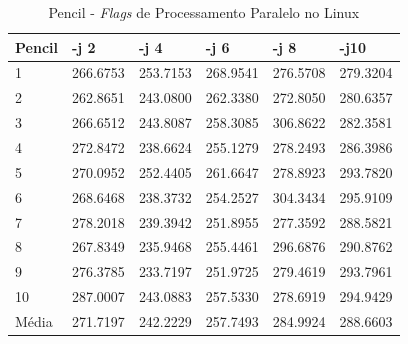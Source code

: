 \begin{apendicesenv}
\begin{table}[!ht]
\centering
\tiny
\caption{Pencil - \textit{Flags} de Processamento Paralelo no Linux}
\label{tab:flag_processamento_paralelo:linux:pencil}
\begin{tabular}{llllll}
\textbf{Pencil} & \textbf{-j 2} & \textbf{-j 4} & \textbf{-j 6} & \textbf{-j 8} & \textbf{-j10}  \\ \toprule
1                  & 266.6753  &   253.7153   &  268.9541 &    276.5708 &    279.3204       \\ 
2                  & 262.8651  &   243.0800   &  262.3380 &    272.8050 &    280.6357       \\ 
3                  & 266.6512  &   243.8087   &  258.3085 &    306.8622 &    282.3581       \\ 
4                  & 272.8472  &   238.6624   &  255.1279 &    278.2493 &    286.3986       \\ 
5                  & 270.0952  &   252.4405   &  261.6647 &    278.8923 &    293.7820       \\ 
6                  & 268.6468  &   238.3732   &  254.2527 &    304.3434 &    295.9109       \\ 
7                  & 278.2018  &   239.3942   &  251.8955 &    277.3592 &    288.5821       \\ 
8                  & 267.8349  &   235.9468   &  255.4461 &    296.6876 &    290.8762       \\ 
9                  & 276.3785  &   233.7197   &  251.9725 &    279.4619 &    293.7961       \\ 
10                 & 287.0007  &   243.0883   &  257.5330 &    278.6919 &    294.9429       \\ \bottomrule
Média              & 271.7197  &   242.2229   &  257.7493 &    284.9924 &    288.6603       \\ 
\end{tabular}
\end{table}


\end{apendicesenv}
